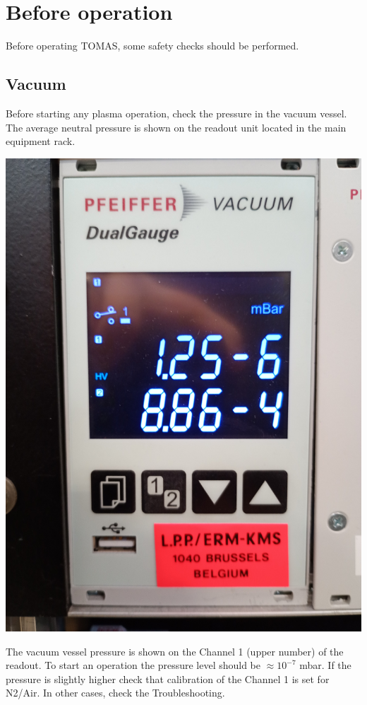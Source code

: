 \documentclass[fleqn,a4paper,20pt]{article}
\begin{document}
\newpage
\section{Before operation}%


Before operating TOMAS, some safety checks should be performed.

\subsection{Vacuum}

Before starting any plasma operation, check the pressure in the vacuum vessel. 
The average neutral pressure is shown on the readout unit located in the main equipment rack.\\


\begin{minipage}{.3\textwidth}
	\centering
	\includegraphics[width=\linewidth]{Pressure1}
\end{minipage}
\begin{minipage}{.02\textwidth}
\end{minipage}
\begin{minipage}{.68\textwidth}
	The vacuum vessel pressure is shown on the Channel 1 (upper number) of the readout. To start an operation the pressure level should be $\approx10^{-7}$ mbar. If the pressure is slightly higher check that calibration of the Channel 1 is set for N2/Air. In other cases, check the Troubleshooting.
\end{minipage}
\end{document}
